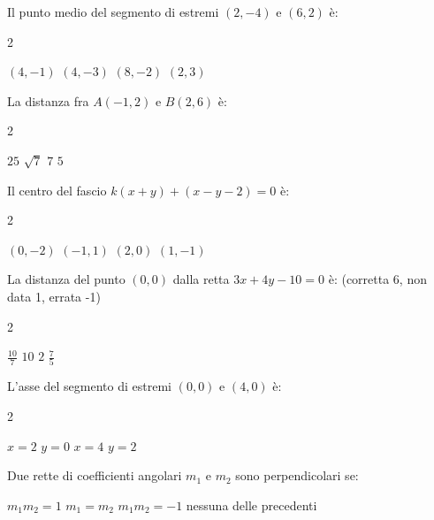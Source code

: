 \documentclass[a4paper,10pt]{exam}
\begin{document}
\vspace{2mm}
\begin{questions}
\question Il punto medio del segmento di estremi $(2,-4)$ e $(6,2)$ è:
\vspace{0.2em}
\begin{multicols}{2}
\begin{choices}
\choice $(4,-1)$
\choice $(4,-3)$
\choice $(8,-2)$
\choice $(2,3)$
\end{choices}
\end{multicols}

\question La distanza fra $A(-1,2)$ e $B(2,6)$ è:
\vspace{0.2em}
\begin{multicols}{2}
\begin{choices}
\choice $25$
\choice $\sqrt{7}$
\choice $7$
\choice $5$
\end{choices}
\end{multicols}

\question Il centro del fascio $k(x+y)+(x-y-2)=0$ è:
\vspace{0.2em}
\begin{multicols}{2}
\begin{choices}
\choice $(0,-2)$
\choice $(-1,1)$
\choice $(2,0)$
\choice $(1,-1)$
\end{choices}
\end{multicols}

\question La distanza del punto $(0,0)$ dalla retta $3x+4y-10=0$ è: \hfill{\footnotesize (corretta 6, non data 1, errata -1)}
\vspace{0.2em}
\begin{multicols}{2}
\begin{choices}
\choice $\frac{10}{7}$
\choice $10$
\choice $2$
\choice $\frac{7}{5}$
\end{choices}
\end{multicols}

\question L'asse del segmento di estremi $(0,0)$ e $(4,0)$ è:
\vspace{0.2em}
\begin{multicols}{2}
\begin{choices}
\choice $x=2$
\choice $y=0$
\choice $x=4$
\choice $y=2$
\end{choices}
\end{multicols}

\question Due rette di coefficienti angolari $m_1$ e $m_2$ sono perpendicolari se:
\vspace{0.2em}
\begin{choices}
\choice $m_1m_2=1$
\choice $m_1=m_2$
\choice $m_1m_2=-1$
\choice nessuna delle precedenti
\end{choices}


\end{questions}
\end{document}
